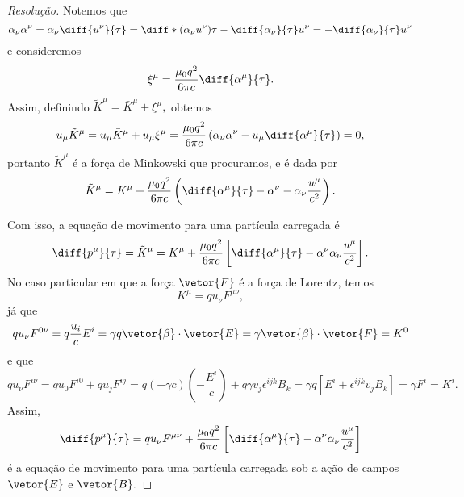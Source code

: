 \begin{proof}[Resolução]
   Notemos que
   \begin{equation*}
      \alpha_\nu \alpha^\nu = \alpha_\nu \diff{u^\nu}{\tau} = \diff*{(\alpha_\nu u^\nu)}{\tau} - \diff{\alpha_\nu}{\tau} u^\nu = - \diff{\alpha_\nu}{\tau} u^\nu
   \end{equation*}
   e consideremos
   \begin{equation*}
      \xi^\mu = \frac{\mu_0q^2}{6\pi c} \diff{\alpha^\mu}{\tau}.
   \end{equation*}
   Assim, definindo \(\tilde{K}^\mu = \bar{K}^\mu + \xi^\mu,\) obtemos
   \begin{equation*}
      u_\mu \tilde{K}^\mu = u_\mu \bar{K}^\mu + u_\mu \xi^\mu = \frac{\mu_0 q^2}{6\pi c}\left(\alpha_\nu \alpha^\nu - u_\mu \diff{\alpha^\mu}{\tau}\right) = 0,
   \end{equation*}
   portanto \(\tilde{K}^\mu\) é a força de Minkowski que procuramos, e é dada por
   \begin{equation*}
      \tilde{K}^\mu = K^\mu + \frac{\mu_0 q^2}{6\pi c}\left(\diff{\alpha^\mu}{\tau} - \alpha^\nu - \alpha_\nu \frac{u^\mu}{c^2}\right).
   \end{equation*}
 
   Com isso, a equação de movimento para uma partícula carregada é
   \begin{equation*}
      \diff{p^\mu}{\tau} = \tilde{K}^\mu = K^\mu + \frac{\mu_0q^2}{6\pi c}\left[\diff{\alpha^\mu}{\tau} - \alpha^\nu \alpha_\nu \frac{u^\mu}{c^2}\right].
   \end{equation*}
   No caso particular em que a força \(\vetor{F}\) é a força de Lorentz, temos
   \begin{equation*}
      K^\mu = q u_\nu F^{\mu\nu},
   \end{equation*}
   já que
   \begin{equation*}
      q u_\nu F^{0\nu} = q\frac{u_i}{c} E^i = \gamma q \vetor{\beta} \cdot \vetor{E} = \gamma \vetor{\beta} \cdot \vetor{F} = K^0
   \end{equation*}
   e que
   \begin{equation*}
      q u_\nu F^{i\nu} = q u_0 F^{i0} + q u_j F^{ij} = q (-\gamma c) \left(-\frac{E^i}{c}\right) + q \gamma v_j \epsilon^{ijk} B_k = \gamma q\left[E^i + \epsilon^{ijk} v_j B_k\right] = \gamma F^i = K^i.
   \end{equation*}
   Assim,
   \begin{equation*}
      \diff{p^\mu}{\tau} = q u_\nu F^{\mu\nu} + \frac{\mu_0 q^2}{6\pi c}\left[\diff{\alpha^\mu}{\tau} - \alpha^\nu \alpha_\nu \frac{u^\mu}{c^2}\right]
   \end{equation*}
   é a equação de movimento para uma partícula carregada sob a ação de campos \(\vetor{E}\) e \(\vetor{B}.\)
\end{proof}
